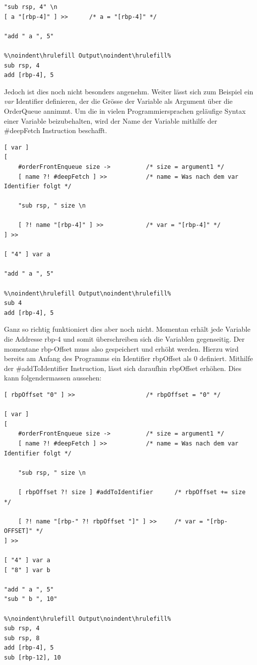 \begin{lstlisting}[language=QHS, caption=Definition einer Variable mit viel LiteralCode]
"sub rsp, 4" \n
[ a "[rbp-4]" ] >>      /* a = "[rbp-4]" */

"add " a ", 5"

%\noindent\hrulefill Output\noindent\hrulefill%
sub rsp, 4
add [rbp-4], 5
\end{lstlisting}

Jedoch ist dies noch nicht besonders angenehm. Weiter lässt sich zum Beispiel ein \textit{var} Identifier definieren, der die Grösse der Variable als Argument über die OrderQueue annimmt. Um die in vielen Programmiersprachen geläufige Syntax
einer Variable beizubehalten, wird der Name der Variable mithilfe der \#deepFetch Instruction beschafft.

\begin{lstlisting}[language=QHS, caption=Definition einer Variable mit \textit{var} Identifier]
[ var ]
[
    #orderFrontEnqueue size ->          /* size = argument1 */
    [ name ?! #deepFetch ] >>           /* name = Was nach dem var Identifier folgt */

    "sub rsp, " size \n

    [ ?! name "[rbp-4]" ] >>            /* var = "[rbp-4]" */
] >> 

[ "4" ] var a 

"add " a ", 5"
    
%\noindent\hrulefill Output\noindent\hrulefill%
sub 4
add [rbp-4], 5
\end{lstlisting}

Ganz so richtig funktioniert dies aber noch nicht. Momentan erhält jede Variable die Addresse rbp-4 und somit überschreiben sich die Variablen gegenseitig. Der momentane rbp-Offset muss also gespeichert und erhöht werden.
Hierzu wird bereits am Anfang des Programms ein Identifier rbpOffset als 0 definiert. Mithilfe der \#addToIdentifier Instruction, lässt sich daraufhin rbpOffset erhöhen. Dies kann folgendermassen aussehen:

\begin{minipage}{\linewidth}
\begin{lstlisting}[language=QHS, caption=Definition einer Variable mit rbpOffset]
[ rbpOffset "0" ] >>                    /* rbpOffset = "0" */

[ var ]
[
    #orderFrontEnqueue size ->          /* size = argument1 */
    [ name ?! #deepFetch ] >>           /* name = Was nach dem var Identifier folgt */

    "sub rsp, " size \n

    [ rbpOffset ?! size ] #addToIdentifier      /* rbpOffset += size */

    [ ?! name "[rbp-" ?! rbpOffset "]" ] >>     /* var = "[rbp-OFFSET]" */
] >> 

[ "4" ] var a 
[ "8" ] var b 

"add " a ", 5"
"sub " b ", 10"
    
%\noindent\hrulefill Output\noindent\hrulefill%
sub rsp, 4
sub rsp, 8
add [rbp-4], 5
sub [rbp-12], 10
\end{lstlisting}
\end{minipage}

